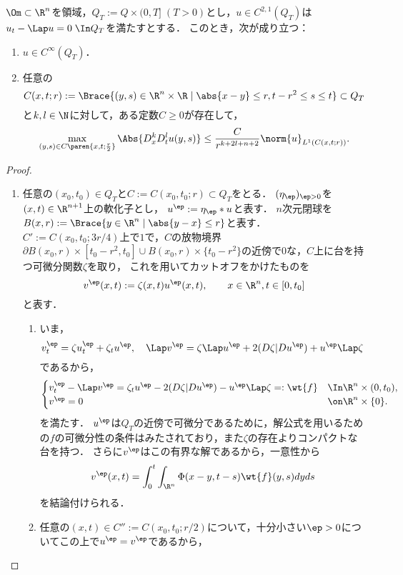 \documentclass[uplatex,dvipdfmx]{jsarticle}
\begin{document}
\begin{problem}[正則性]
    $\Om\subset\R^n$を領域，$Q_T:=Q\times{(0,T]}\;(T>0)$とし，$u\in C^{2,1}(Q_T)$は$u_t-\Lap u=0\;\In Q_T$を満たすとする．
    このとき，次が成り立つ：
    \begin{enumerate}
        \item $u\in C^\infty(Q_T)$．
        \item 任意の
        \[C(x,t;r):=\Brace{(y,s)\in\R^n\times\R\mid\abs{x-y}\le r,t-r^2\le s\le t}\subset Q_T\]
        と$k,l\in\N$に対して，ある定数$C\ge0$が存在して，
        \[\max_{(y,s)\in C\paren{x,t;\frac{r}{2}}}\Abs{D^k_xD^l_tu(y,s)}\le\frac{C}{r^{k+2l+n+2}}\norm{u}_{L^1(C(x,t;r))}.\]
    \end{enumerate}
\end{problem}
\begin{proof}\mbox{}
    \begin{enumerate}
        \item 任意の$(x_0,t_0)\in Q_T$と$C:=C(x_0,t_0;r)\subset Q_T$をとる．
        $(\eta_\ep)_{\ep>0}$を$(x,t)\in\R^{n+1}$上の軟化子とし，
        $u^\ep:=\eta_\ep*u$と表す．
        $n$次元閉球を$B(x,r):=\Brace{y\in\R^n\mid\abs{y-x}\le r}$と表す．
        $C':=C(x_0,t_0;3r/4)$上で$1$で，$C$の放物境界$\partial B(x_0,r)\times[t_0-r^2,t_0]\cup B(x_0,r)\times\{t_0-r^2\}$の近傍で$0$な，$C$上に台を持つ可微分関数$\zeta$を取り，
        これを用いてカットオフをかけたものを
        \[v^\ep(x,t):=\zeta(x,t)u^\ep(x,t),\qquad x\in\R^n,t\in[0,t_0]\]
        と表す．
        \begin{enumerate}[{Step}1]
            \item いま，
            \[v_t^\ep=\zeta u^\ep_t+\zeta_tu^\ep,\quad\Lap v^\ep=\zeta\Lap u^\ep+2(D\zeta|Du^\ep)+u^\ep\Lap\zeta\]
            であるから，
            \[\begin{cases}
                v^\ep_t-\Lap v^\ep=\zeta_tu^\ep-2(D\zeta|Du^\ep)-u^\ep\Lap\zeta=:\wt{f}&\In\R^n\times(0,t_0),\\
                v^\ep=0&\on\R^n\times\{0\}.
            \end{cases}\]
            を満たす．
            $u^\ep$は$Q_T$の近傍で可微分であるために，解公式を用いるための$f$の可微分性の条件はみたされており，また$\zeta$の存在よりコンパクトな台を持つ．
            さらに$v^\ep$はこの有界な解であるから，一意性から
            \[v^\ep(x,t)=\int^t_0\int_{\R^n}\Phi(x-y,t-s)\wt{f}(y,s)dyds\]
            を結論付けられる．
            \item 任意の$(x,t)\in C'':=C(x_0,t_0;r/2)$について，十分小さい$\ep>0$についてこの上で$u^\ep=v^\ep$であるから，

\end{enumerate}
\end{enumerate}
\end{proof}
\end{document}
